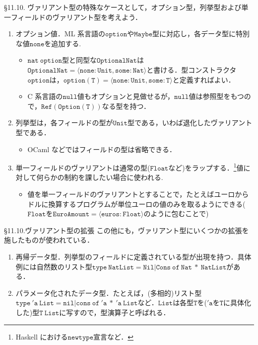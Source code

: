 \documentclass[9pt]{beamer}
\begin{document}
\begin{frame}{\S11.10.}
ヴァリアント型の特殊なケースとして，オプション型，列挙型および単一フィールドのヴァリアント型を考えよう．
\begin{enumerate}
\item オプション値．ML 系言語の$\mathtt{option}$や$\mathtt{Maybe}$型に対応し，各データ型に特別な値$\mathtt{none}$を追加する.\begin{itemize}\item $\mathtt{nat\ option}$型と同型な$\mathtt{OptionalNat}$は$\mathtt{OptionalNat = \langle none:Unit, some:Nat\rangle}$と書ける．型コンストラクタ$\mathtt{option}$は，$\mathtt{option(T) = \langle none:Unit, some:T\rangle}$と定義すればよい．
\item C 系言語の$\mathtt{null}$値もオプションと見做せるが，$\mathtt{null}$値は参照型をもつので，$\mathtt{Ref(Option(T))}$なる型を持つ．
\end{itemize}
\item 列挙型は，各フィールドの型が$\mathtt{Unit}$型である，いわば退化したヴァリアント型である．\begin{itemize}
\item OCaml などではフィールドの型は省略できる．
\end{itemize}
\item 単一フィールドのヴァリアントは通常の型($\mathtt{Float}$など)をラップする．\footnote{Haskell における$\mathtt{newtype}$宣言など．}値に対して何らかの制約を課したい場合に使われる.\begin{itemize}
\item 値を単一フィールドのヴァリアントとすることで，たとえばユーロからドルに換算するプログラムが単位ユーロの値のみを取るようにできる($\mathtt{Float}$を$\mathtt{EuroAmount =\langle euros:Float\rangle}$のように包むことで)
\end{itemize}
\end{enumerate}
\end{frame}
\begin{frame}{\S11.10.ヴァリアント型の拡張}
この他にも，ヴァリアント型にいくつかの拡張を施したものが使われている．
\begin{enumerate}
\item 再帰データ型．列挙型のフィールドに定義されている型が出現を持つ．具体例には自然数のリスト型$\mathtt{type\ NatList= Nil|Cons\ of\ Nat\ *\ NatList}$がある．
\item パラメータ化されたデータ型．たとえば，(多相的)リスト型$\mathtt{type\ 'a\ List = nil|cons\ of\ 'a\ *\ 'a\ List}$など．$\mathtt{List}$は各型$\mathtt{T}$を($\mathtt{'a}$を$\mathtt{T}$に具体化した)型$\mathtt{T\ List}$に写すので，型演算子と呼ばれる．
\end{enumerate}
\end{frame}
\end{document}
